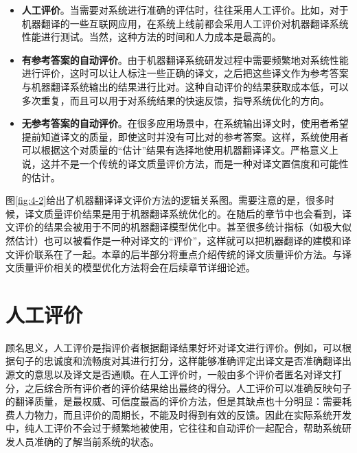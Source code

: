 \begin{itemize}
\vspace{0.5em}
\item {\small\sffamily\bfseries{人工评价}}。当需要对系统进行准确的评估时，往往采用人工评价。比如，对于机器翻译的一些互联网应用，在系统上线前都会采用人工评价对机器翻译系统性能进行测试。当然，这种方法的时间和人力成本是最高的。
\vspace{0.5em}
\item {\small\sffamily\bfseries{有参考答案的自动评价}}。由于机器翻译系统研发过程中需要频繁地对系统性能进行评价，这时可以让人标注一些正确的译文，之后把这些译文作为参考答案与机器翻译系统输出的结果进行比对。这种自动评价的结果获取成本低，可以多次重复，而且可以用于对系统结果的快速反馈，指导系统优化的方向。
\vspace{0.5em}
\item {\small\sffamily\bfseries{无参考答案的自动评价}}。在很多应用场景中，在系统输出译文时，使用者希望提前知道译文的质量，即使这时并没有可比对的参考答案。这样，系统使用者可以根据这个对质量的“估计”结果有选择地使用机器翻译译文。严格意义上说，这并不是一个传统的译文质量评价方法，而是一种对译文置信度和可能性的估计。
\vspace{0.5em}
\end{itemize}

\parinterval 图\ref{fig:4-2}给出了机器翻译译文评价方法的逻辑关系图。需要注意的是，很多时候，译文质量评价结果是用于机器翻译系统优化的。在随后的章节中也会看到，译文评价的结果会被用于不同的机器翻译模型优化中。甚至很多统计指标（如极大似然估计）也可以被看作是一种对译文的“评价”，这样就可以把机器翻译的建模和译文评价联系在了一起。本章的后半部分将重点介绍传统的译文质量评价方法。与译文质量评价相关的模型优化方法将会在后续章节详细论述。


\sectionnewpage
\section{人工评价}\label{Manual evaluation}

\parinterval 顾名思义，人工评价是指评价者根据翻译结果好坏对译文进行评价。例如，可以根据句子的忠诚度和流畅度对其进行打分，这样能够准确评定出译文是否准确翻译出源文的意思以及译文是否通顺。在人工评价时，一般由多个评价者匿名对译文打分，之后综合所有评价者的评价结果给出最终的得分。人工评价可以准确反映句子的翻译质量，是最权威、可信度最高的评价方法，但是其缺点也十分明显：需要耗费人力物力，而且评价的周期长，不能及时得到有效的反馈。因此在实际系统开发中，纯人工评价不会过于频繁地被使用，它往往和自动评价一起配合，帮助系统研发人员准确的了解当前系统的状态。

